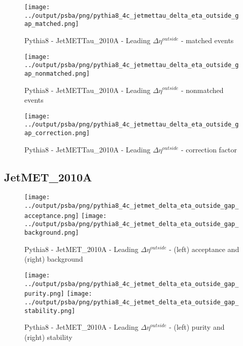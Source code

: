 \documentclass[11pt]{book}
\begin{document}
\begin{figure}[ht]
\centering
\texttt{[image: ../output/psba/png/pythia8\_4c\_jetmettau\_delta\_eta\_outside\_gap\_matched.png]}
\caption{Pythia8 - JetMETTau\_2010A - Leading $\Delta\eta^{outside}$ - matched events}
\label{fig:p8_jetmettau_delta_eta_outside_gap_matched}
\end{figure}

\begin{figure}[ht]
\centering
\texttt{[image: ../output/psba/png/pythia8\_4c\_jetmettau\_delta\_eta\_outside\_gap\_nonmatched.png]}
\caption{Pythia8 - JetMETTau\_2010A - Leading $\Delta\eta^{outside}$ - nonmatched events}
\label{fig:p8_jetmettau_delta_eta_outside_gap_nonmatched}
\end{figure}

\begin{figure}[ht]
\centering
\texttt{[image: ../output/psba/png/pythia8\_4c\_jetmettau\_delta\_eta\_outside\_gap\_correction.png]}
\caption{Pythia8 - JetMETTau\_2010A - Leading $\Delta\eta^{outside}$ - correction factor}
\label{fig:p8_jetmettau_delta_eta_outside_gap_correction}
\end{figure}



\clearpage
\subsection{JetMET\_2010A}

\begin{figure}[ht]
\centering
\texttt{[image: ../output/psba/png/pythia8\_4c\_jetmet\_delta\_eta\_outside\_gap\_acceptance.png]}
\texttt{[image: ../output/psba/png/pythia8\_4c\_jetmet\_delta\_eta\_outside\_gap\_background.png]}
\caption{Pythia8 - JetMET\_2010A - Leading $\Delta\eta^{outside}$ - (left) acceptance and (right) background}
\label{fig:p8_jetmet_delta_eta_outside_gap_ab}
\end{figure}

\begin{figure}[ht]
\centering
\texttt{[image: ../output/psba/png/pythia8\_4c\_jetmet\_delta\_eta\_outside\_gap\_purity.png]}
\texttt{[image: ../output/psba/png/pythia8\_4c\_jetmet\_delta\_eta\_outside\_gap\_stability.png]}
\caption{Pythia8 - JetMET\_2010A - Leading $\Delta\eta^{outside}$ - (left) purity and (right) stability}
\label{fig:p8_jetmet_delta_eta_outside_gap_ps}
\end{figure}
\end{document}
